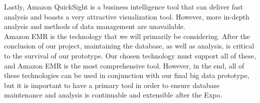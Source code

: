         \noindent Lastly, Amazon QuickSight is a business intelligence tool that can deliver fast analysis and boasts a very attractive visualization tool. However, more in-depth analysis and methods of data management are unavailable.\\

        \noindent Amazon EMR is the technology that we will primarily be considering. After the conclusion of our project, maintaining the database, as well as analysis, is critical to the survival of our prototype. Our chosen technology must support all of these, and Amazon EMR is the most comprehensive tool. However, in the end, all of these technologies can be used in conjunction with our final big data prototype, but it is important to have a primary tool in order to ensure database maintenance and analysis is continuable and extensible after the Expo.\\
    
